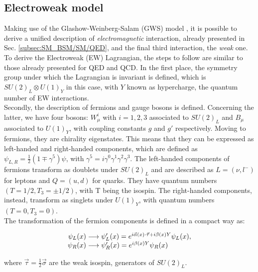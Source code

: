\subsection{Electroweak model}\label{subsec:SM_BSM/SM/EW}
Making use of the Glashow-Weinberg-Salam (GWS) model \cite{pich_QED_EW,Weinberg_EW}, it is possible to derive a unified description of \textit{electromagnetic} interaction, already presented in Sec. \ref{subsec:SM_BSM/SM/QED}, and the final third interaction, the \textit{weak} one.\\
To derive the Electroweak (EW) Lagrangian, the steps to follow are similar to those already presented for QED and QCD. In the first place, the symmetry group under which the Lagrangian is invariant is defined, which is $SU(2)_L \otimes U(1)_Y$ in this case, with $Y$ known as hypercharge, the quantum number of EW interactions.\\
Secondly, the description of fermions and gauge bosons is defined. Concerning the latter, we have four bosons: $W^i_\mu$ with $i=1,2,3$ associated to $SU(2)_L$ and $B_\mu$ associated to $U(1)_Y$, with coupling constants $g$ and $g'$ respectively.
Moving to fermions, they are chirality eigenstates. This means that they can be expressed as left-handed and right-handed components, which are defined as $\psi_{L,R} = \frac{1}{2}(1 \mp \gamma^5)\psi$, with $\gamma^5 = i\gamma^0\gamma^1\gamma^2\gamma^3$. The left-handed components of fermions transform as doublets under $SU(2)_L$ and are described as $L=\left(\nu,l^-\right)$ for leptons and $Q=\left(u,d\right)$ for quarks. They have quantum numbers $(T = 1/2, T_3 = \pm 1/2)$, with T being the isospin. The right-handed components, instead, transform as singlets under $U(1)_Y$, with quantum numbers $(T = 0, T_3 = 0)$.\\ 
The transformation of the fermion components is defined in a compact way as:

\begin{equation}\label{eq:SM_BSM/EW/field_EW}
\begin{array}{r@{\;}l}
  \psi_L(x) &\longrightarrow \psi'_L(x) = e^{i\vec{\alpha}(x)\cdot\vec{\tau} + i\beta(x)Y} \psi_L(x), \\
  \psi_R(x) &\longrightarrow \psi'_R(x) = e^{i\beta(x)Y} \psi_R(x)
\end{array}
\end{equation}

\noindent where $\vec{\tau} = \frac{1}{2}\vec{\sigma}$ are the weak isospin, generators of $SU(2)_L$. \\

